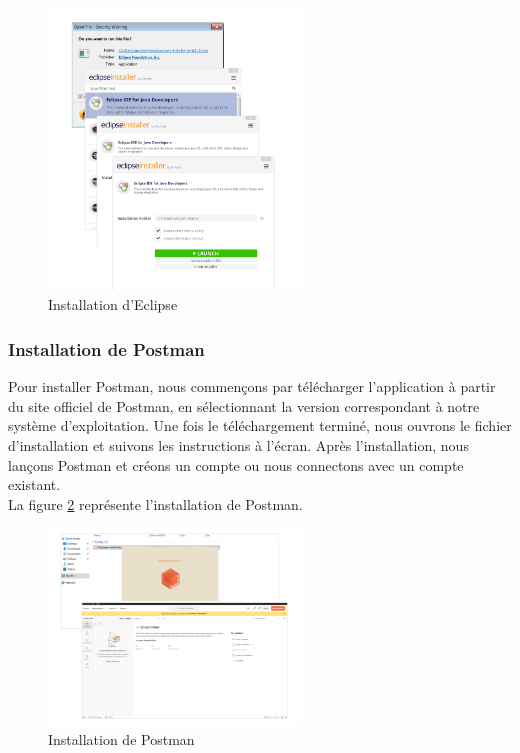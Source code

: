 \documentclass[12pt]{report}
\begin{document}
			\begin{figure}[h]
				\centering
				\includegraphics[width=0.6\textwidth]{eclipseinstall.png}
				\caption{Installation d'Eclipse}
				\label{fig:eclipseinstall}
			\end{figure}
			\FloatBarrier


			\subsubsection{Installation de Postman}

			\hspace{15pt} Pour installer Postman, nous commençons par télécharger l'application à partir du site officiel de Postman, en sélectionnant la version correspondant à notre système d'exploitation. Une fois le téléchargement terminé, nous ouvrons le fichier d'installation et suivons les instructions à l'écran. Après l'installation, nous lançons Postman et créons un compte ou nous connectons avec un compte existant.\\

			La figure \ref{fig:postman} représente l’installation de Postman.
			
			\begin{figure}[h]
				\centering
				\includegraphics[width=0.6\textwidth]{postman.png}
				\caption{Installation de Postman}
				\label{fig:postman}
			\end{figure}
			\FloatBarrier
			
\end{document}
